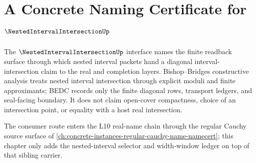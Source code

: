 \chapter{A Concrete Naming Certificate for $\NestedIntervalIntersectionUp$}
\label{ch:concrete-instances-nestedintervalintersection-namecert}

The $\NestedIntervalIntersectionUp$ interface names the finite readback surface through which nested interval packets hand a diagonal interval-intersection claim to the real and completion layers. Bishop--Bridges constructive analysis treats nested interval intersection through explicit moduli and finite approximants; BEDC records only the finite diagonal rows, transport ledgers, and seal-facing boundary. It does not claim open-cover compactness, choice of an intersection point, or equality with a host real intersection.

The consumer route enters the L10 real-name chain through the regular Cauchy source surface of \autoref{ch:concrete-instances-regular-cauchy-name-namecert}; this chapter only adds the nested-interval selector and width-window ledger on top of that sibling carrier.

